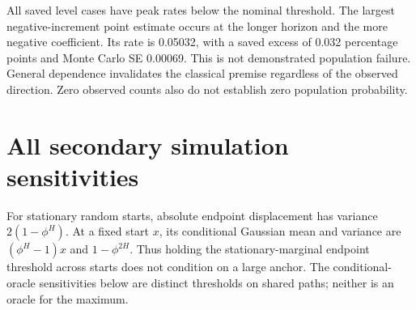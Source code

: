\documentclass[11pt,a4paper]{article}
\begin{document}
All saved level cases have peak rates below the nominal threshold.
The largest negative-increment point estimate occurs at the longer horizon and
the more negative coefficient. Its rate is 0.05032,
with a saved excess of 0.032
percentage points and Monte Carlo SE 0.00069.
This is not demonstrated population failure. General dependence invalidates the
classical premise regardless of the observed direction. Zero observed counts
also do not establish zero population probability.\section{All secondary simulation sensitivities}\label{sup:simulation-secondary}

For stationary random starts, absolute endpoint displacement has
variance \(2(1-\phi^H)\). At a fixed start \(x\), its conditional Gaussian
mean and variance are \((\phi^H-1)x\) and \(1-\phi^{2H}\). Thus holding the
stationary-marginal endpoint threshold across starts does not condition on a
large anchor. The conditional-oracle sensitivities below are distinct thresholds
on shared paths; neither is an oracle for the maximum.
\begingroup
\scriptsize
\setlength{\tabcolsep}{3pt}
\renewcommand{\arraystretch}{1.12}
\end{document}
